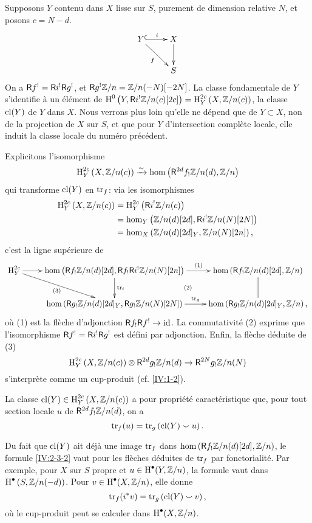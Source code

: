 Supposons $Y$ contenu dans $X$ lisse sur $S$, purement de dimension relative 
$N$, et posons $c=N-d$. 
\[\xymatrix{
  Y \ar@{^{(}->}[r]^-i \ar[dr]_-f 
    & X \ar[d] \\
  & S
}\]
On a $\mathsf{R} f^! = \mathsf{R} i^!\mathsf{R} g^!$, et $\mathsf{R} g^! \mathbb{Z}/n=\mathbb{Z}/n(-N)[-2 N]$. La classe 
fondamentale de $Y$ s'identifie à un élément de 
$\operatorname{H}^0\left(Y,\mathsf{R} i^!\mathbb{Z}/n(c)[2 c]\right)=\operatorname{H}_Y^{2 c}\left(X,\mathbb{Z}/n(c)\right)$, la 
classe $\operatorname{cl}(Y)$ de $Y$ dans $X$. Nous verrons plus loin qu'elle ne dépend que 
de $Y\subset X$, non de la projection de $X$ sur $S$, et que pour $Y$ 
d'intersection complète locale, elle induit la classe locale du numéro 
précédent. 

Explicitons l'isomorphisme 
\[
  \operatorname{H}_Y^{2 c}\left(X,\mathbb{Z}/n(c)\right) \xrightarrow\sim \hom\left(\mathsf{R}^{2 d}f_!\mathbb{Z}/n(d),\mathbb{Z}/n\right)
\]
qui transforme $\operatorname{cl}(Y)$ en $\operatorname{tr}_f$: via les isomorphismes 
\begin{align*}
  \operatorname{H}_Y^{2 c}\left(X,\mathbb{Z}/n(c)\right) 
    &= \operatorname{H}_Y^{2 c}\left(\mathsf{R} i^!\mathbb{Z}/n(c)\right) \\
    &= \hom_Y\left(\mathbb{Z}/n(d)[2 d],\mathsf{R} i^!\mathbb{Z}/n(N)[2 N]\right) \\
    &= \hom_X\left(\mathbb{Z}/n(d)[2 d]_Y,\mathbb{Z}/n(N)[2 n]\right) \text{,}
\end{align*}
c'est la ligne supérieure de 
\[\xymatrix{
  \h_Y^{2 c} \ar[r] \ar[dr]_-{(3)} 
    & \hom\left(\R f_!\dZ/n(d)[2 d],\R f_! \R i^!\dZ/n(N)[2 n]\right) \ar[r]^-{(1)} \ar[d]^-{\tr_i} \ar@{}[dr]|-{(2)}
    & \hom\left(\R f_!\dZ/n(d)[2d],\dZ/n\right) \ar@{=}[d] \\
  & \hom\left(\R g_!\dZ/n(d)[2 d]_Y,\R g_!\dZ/n(N)[2 N]\right) \ar[r]^-{\tr_g} 
    & \hom\left(\R g_!\dZ/n(d)[2 d]_Y,\dZ/n\right) \text{,}
}\]
où (1) est la flèche d'adjonction $\mathsf{R} f_!\mathsf{R} f^!\to \text{id}$. La 
commutativité (2) exprime que l'isomorphisme $\mathsf{R} f^!=\mathsf{R} i^!\mathsf{R} g^!$ est 
défini par adjonction. Enfin, la flèche déduite de (3)
\[
  \operatorname{H}_Y^{2c}\left(X,\mathbb{Z}/n(c)\right) \otimes \mathsf{R}^{2 d} g_!\mathbb{Z}/n(d) \to \mathsf{R}^{2 N} g_!\mathbb{Z}/n(N)
\]
s'interprète comme un cup-produit (cf. \ref{IV:1-2}). 





\begin{definition}\label{IV:2-3-2}
La classe $\operatorname{cl}(Y)\in\operatorname{H}_Y^{2 c}\left(X,\mathbb{Z}/n(c)\right)$ a pour propriété 
caractéristique que, pour tout section locale $u$ de $\mathsf{R}^{2 d}f_! \mathbb{Z}/n(d)$, 
on a 
\[
  \operatorname{tr}_f(u) = \operatorname{tr}_g\left(\operatorname{cl}(Y)\smallsmile u\right) \text{.}
\]
\end{definition}

Du fait que $\operatorname{cl}(Y)$ ait déjà une image $\operatorname{tr}_f$ dans 
$\hom\left(\mathsf{R} f_!\mathbb{Z}/n(d)[2 d],\mathbb{Z}/n\right)$, le formule \ref{IV:2-3-2} vaut 
pour les flèches déduites de $\operatorname{tr}_f$ par fonctorialité. Par exemple, 
pour $X$ sur $S$ propre et $u\in \operatorname{H}^\bullet(Y,\mathbb{Z}/n)$, la formule vaut dans 
$\operatorname{H}^\bullet\left(S,\mathbb{Z}/n(-d)\right)$. Pour $v\in \operatorname{H}^\bullet(X,\mathbb{Z}/n)$, elle 
donne 
\[
  \operatorname{tr}_f(i^* v) = \operatorname{tr}_g\left(\operatorname{cl}(Y)\smallsmile v\right) \text{,}
\]
où le cup-produit peut se calculer dans $\operatorname{H}^\bullet(X,\mathbb{Z}/n)$. 






